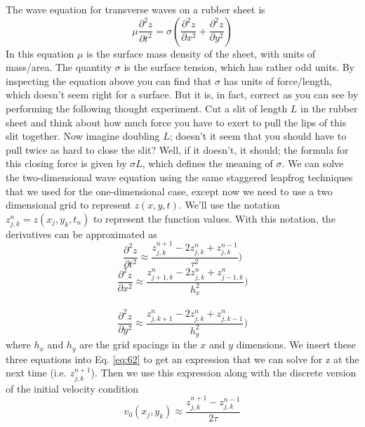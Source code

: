 The wave equation for transverse waves on a rubber sheet is
\begin{equation}\label{eq:62}
\mu \frac{\partial^2 z}{\partial t^2} = \sigma (\frac{\partial^2 z}{\partial x^2} + \frac{\partial^2 z}{\partial y^2} )
\end{equation}
In this equation $\mu$ is the surface mass density of the sheet, with units of mass/area.
The quantity $\sigma$ is the surface tension, which has rather odd units. By inspecting
the equation above you can find that $\sigma$ has units of force/length, which doesn\rq t
seem right for a surface. But it is, in fact, correct as you can see by performing the
following thought experiment. Cut a slit of length $L$ in the rubber sheet and think
about how much force you have to exert to pull the lips of this slit together. Now
imagine doubling $L$; doesn\rq t it seem that you should have to pull twice as hard to close the slit? Well, if it doesn\rq t, it should; the formula for this closing force is
given by $\sigma L$, which defines the meaning of $\sigma$.
We can solve the two-dimensional wave equation using the same staggered
leapfrog techniques that we used for the one-dimensional case, except now we
need to use a two dimensional grid to represent $z(x, y,t)$. We\rq ll use the notation $ z^n_{j,k} = z(x_j,y_k,t_n) $ to represent the function values. With this notation, the
derivatives can be approximated as
\begin{equation}\label{eq:63}
\frac{\partial^2 z}{\partial t^2} \approx \frac{z^{n+1}_{j,k}-2z^n_{j,k}+z^{n-1}_{j,k}}{\tau^2} )
\end{equation}
\begin{equation}\label{eq:64}
\frac{\partial^2 z}{\partial x^2} \approx \frac{z^{n}_{j+1,k}-2z^n_{j,k}+z^{n}_{j-1,k}}{h^2_x} )
\end{equation}\\
\begin{equation}\label{eq:65}
\frac{\partial^2 z}{\partial y^2} \approx \frac{z^{n}_{j,k+1}-2z^n_{j,k}+z^{n}_{j,k-1}}{h^2_y} )
\end{equation}
where $h_x$ and $h_y$ are the grid spacings in the $x$ and $y$ dimensions. We insert these
three equations into Eq. \ref{eq:62} to get an expression that we can solve for z at the
next time (i.e. $z^{n+1}_{j,k} $). Then we use this expression along with the discrete version
of the initial velocity condition
\begin{equation}\label{eq:66}
v_0(x_j,y_k)\approx \frac{z^{n+1}_{j,k}-z^{n-1}_{j,k}}{2\tau}
\end{equation}
